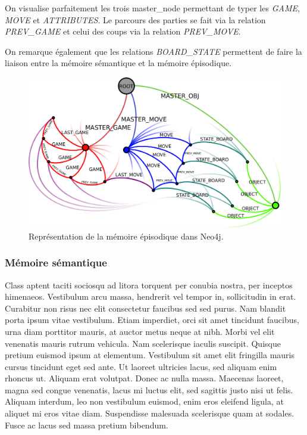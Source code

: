 On visualise parfaitement les trois \og master\_node \fg{} permettant de typer les \emph{GAME}, \emph{MOVE} et \emph{ATTRIBUTES}. Le parcours des parties se fait via la relation \emph{PREV\_GAME} et celui des coups via la relation \emph{PREV\_MOVE}.

On remarque également que les relations \emph{BOARD\_STATE} permettent de faire la liaison entre la mémoire sémantique et la mémoire épisodique.

\begin{figure}[H]
\includegraphics[width=\textwidth]{files/neo4j/episodic_graph}
\caption{Représentation de la mémoire épisodique dans Neo4j.}
\label{episodic_graph}
\end{figure}

\subsubsection{Mémoire sémantique}

Class aptent taciti sociosqu ad litora torquent per conubia nostra, per inceptos himenaeos. Vestibulum arcu massa, hendrerit vel tempor in, sollicitudin in erat. Curabitur non risus nec elit consectetur faucibus sed sed purus. Nam blandit porta ipsum vitae vestibulum. Etiam imperdiet, orci sit amet tincidunt faucibus, urna diam porttitor mauris, at auctor metus neque at nibh. Morbi vel elit venenatis mauris rutrum vehicula. Nam scelerisque iaculis suscipit. Quisque pretium euismod ipsum at elementum. Vestibulum sit amet elit fringilla mauris cursus tincidunt eget sed ante. Ut laoreet ultricies lacus, sed aliquam enim rhoncus ut. Aliquam erat volutpat. Donec ac nulla massa. Maecenas laoreet, magna sed congue venenatis, lacus mi luctus elit, sed sagittis justo nisi ut felis. Aliquam interdum, leo non vestibulum euismod, enim eros eleifend ligula, at aliquet mi eros vitae diam. Suspendisse malesuada scelerisque quam at sodales. Fusce ac lacus sed massa pretium bibendum. 

